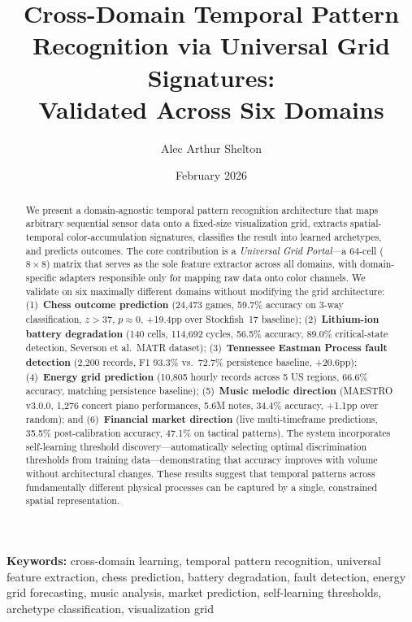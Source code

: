\documentclass[11pt,a4paper]{article}
\title{Cross-Domain Temporal Pattern Recognition via Universal Grid Signatures:\\Validated Across Six Domains}
\author[1]{Alec Arthur Shelton}
\affil[1]{En Pensent Technologies}
\date{February 2026}
\begin{document}
\maketitle

\begin{abstract}
We present a domain-agnostic temporal pattern recognition architecture that maps
arbitrary sequential sensor data onto a fixed-size visualization grid, extracts
spatial-temporal color-accumulation signatures, classifies the result into learned
archetypes, and predicts outcomes. The core contribution is a \emph{Universal Grid
Portal}---a 64-cell ($8\times8$) matrix that serves as the sole feature extractor
across all domains, with domain-specific adapters responsible only for mapping raw
data onto color channels. We validate on six maximally different domains without
modifying the grid architecture: (1)~\textbf{Chess outcome prediction}
(24,473 games, 59.7\% accuracy on 3-way classification, $z>37$, $p\approx0$, +19.4pp over
Stockfish~17 baseline); (2)~\textbf{Lithium-ion battery degradation} (140
cells, 114,692 cycles, 56.5\% accuracy, 89.0\% critical-state detection, Severson
et al.\ MATR dataset); (3)~\textbf{Tennessee Eastman Process fault detection}
(2,200 records, F1 93.3\% vs.\ 72.7\% persistence baseline, +20.6pp);
(4)~\textbf{Energy grid prediction} (10,805 hourly records across 5 US
regions, 66.6\% accuracy, matching persistence baseline);
(5)~\textbf{Music melodic direction} (MAESTRO v3.0.0, 1,276 concert piano
performances, 5.6M notes, 34.4\% accuracy, +1.1pp over random);
and (6)~\textbf{Financial market direction} (live multi-timeframe predictions,
35.5\% post-calibration accuracy, 47.1\% on tactical patterns). The system
incorporates self-learning threshold discovery---automatically selecting optimal
discrimination thresholds from training data---demonstrating that accuracy
improves with volume without architectural changes. These results suggest that
temporal patterns across fundamentally different physical processes can be captured
by a single, constrained spatial representation.
\end{abstract}

\noindent\textbf{Keywords:} cross-domain learning, temporal pattern recognition,
universal feature extraction, chess prediction, battery degradation, fault detection,
energy grid forecasting, music analysis, market prediction, self-learning thresholds,
archetype classification, visualization grid
\end{document}
